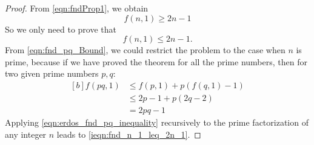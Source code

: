 \documentclass{article}
\theoremstyle{definition}
\numberwithin{equation}{theorem}
\numberwithin{figure}{theorem}
\newcommand{\fnd}[2]{\ensuremath{f(#1,#2)}}
\begin{document}
    \begin{proof}
        From \eqref{eqn:fndProp1}, we obtain 
        \begin{equation}\label{ieqn:fnd_n_1_get_2n_1}
            \fnd{n}{1} \geq 2 n - 1
        \end{equation}            
        So we only need to prove that 
        \begin{equation}\label{ieqn:fnd_n_1_leq_2n_1}
            \fnd{n}{1} \leq 2n - 1.
        \end{equation}            
        From \eqref{eqn:fnd_pq_Bound}, we could restrict the problem to the case when $n$ is prime, 
        because if we have proved the theorem for all 
        the prime numbers,
        then for two given prime numbers $p,q$:
        \begin{equation}\label{eqn:erdos_fnd_pq_inequality}
        \begin{aligned}[b]
            \fnd{pq}{1} &\leq \fnd{p}{1} + p (\fnd{q}{1} - 1) \\
            &\leq 2 p - 1 + p (2 q - 2) \\
            &= 2pq - 1         
        \end{aligned}
        \end{equation}
        Applying \eqref{eqn:erdos_fnd_pq_inequality} recursively 
        to the prime factorization of any integer 
        $n$ leads to \eqref{ieqn:fnd_n_1_leq_2n_1}.
    

\end{proof}
\end{document}
